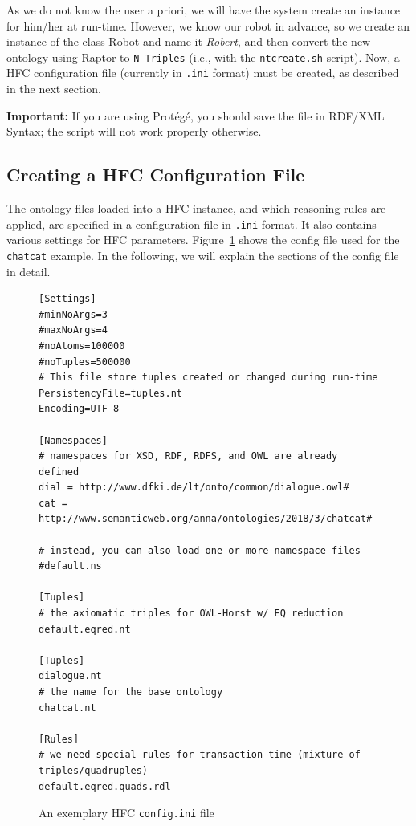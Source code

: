 As we do not know the user a priori, we will have the system create an instance
for him/her at run-time. However, we know our robot in advance, so we create an
instance of the class Robot and name it \textit{Robert}, and then convert the
new ontology using Raptor to \texttt{N-Triples} (i.e., with the
\texttt{ntcreate.sh} script). Now, a HFC configuration file (currently in
\texttt{.ini} format) must be created, as described in the next section.

\textbf{Important:} If you are using Prot\'eg\'e, you should save the file in
RDF/XML Syntax; the script will not work properly otherwise.

\subsection{Creating a HFC Configuration File}

The ontology files loaded into a HFC instance, and which reasoning rules are
applied, are specified in a configuration file in \texttt{.ini} format. It
also contains various settings for HFC parameters. Figure~\ref{fig:ini} shows
the config file used for the \texttt{chatcat} example. In the following, we
will explain the sections of the config file in detail.

\begin{figure} [htb]
\small%
\begin{verbatim}
[Settings]
#minNoArgs=3
#maxNoArgs=4
#noAtoms=100000
#noTuples=500000
# This file store tuples created or changed during run-time
PersistencyFile=tuples.nt
Encoding=UTF-8

[Namespaces]
# namespaces for XSD, RDF, RDFS, and OWL are already defined
dial = http://www.dfki.de/lt/onto/common/dialogue.owl#
cat = http://www.semanticweb.org/anna/ontologies/2018/3/chatcat#

# instead, you can also load one or more namespace files
#default.ns

[Tuples]
# the axiomatic triples for OWL-Horst w/ EQ reduction
default.eqred.nt

[Tuples]
dialogue.nt
# the name for the base ontology
chatcat.nt

[Rules]
# we need special rules for transaction time (mixture of triples/quadruples)
default.eqred.quads.rdl
\end{verbatim}
\caption{An exemplary HFC \texttt{config.ini} file}
\label{fig:ini}
\end{figure}



